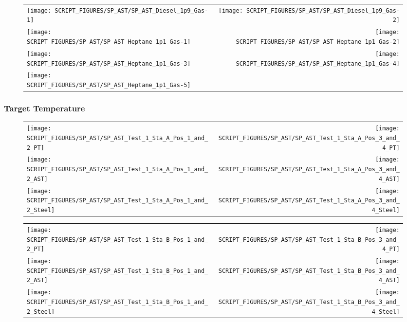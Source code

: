 \begin{figure}[!ht]
\begin{tabular*}{\textwidth}{l@{\extracolsep{\fill}}r}
\texttt{[image: SCRIPT\_FIGURES/SP\_AST/SP\_AST\_Diesel\_1p9\_Gas-1]}   &  \texttt{[image: SCRIPT\_FIGURES/SP\_AST/SP\_AST\_Diesel\_1p9\_Gas-2]}    \\
\texttt{[image: SCRIPT\_FIGURES/SP\_AST/SP\_AST\_Heptane\_1p1\_Gas-1]}  &  \texttt{[image: SCRIPT\_FIGURES/SP\_AST/SP\_AST\_Heptane\_1p1\_Gas-2]}    \\
\texttt{[image: SCRIPT\_FIGURES/SP\_AST/SP\_AST\_Heptane\_1p1\_Gas-3]}  &  \texttt{[image: SCRIPT\_FIGURES/SP\_AST/SP\_AST\_Heptane\_1p1\_Gas-4]}     \\
\texttt{[image: SCRIPT\_FIGURES/SP\_AST/SP\_AST\_Heptane\_1p1\_Gas-5]}  &
\end{tabular*}
\label{SP_Diesel_1p9_Gas}
\end{figure}

\clearpage

\subsubsection{Target Temperature}

\begin{figure}[!ht]
\begin{tabular*}{\textwidth}{l@{\extracolsep{\fill}}r}
\texttt{[image: SCRIPT\_FIGURES/SP\_AST/SP\_AST\_Test\_1\_Sta\_A\_Pos\_1\_and\_2\_PT]} &
\texttt{[image: SCRIPT\_FIGURES/SP\_AST/SP\_AST\_Test\_1\_Sta\_A\_Pos\_3\_and\_4\_PT]} \\
\texttt{[image: SCRIPT\_FIGURES/SP\_AST/SP\_AST\_Test\_1\_Sta\_A\_Pos\_1\_and\_2\_AST]} &
\texttt{[image: SCRIPT\_FIGURES/SP\_AST/SP\_AST\_Test\_1\_Sta\_A\_Pos\_3\_and\_4\_AST]} \\
\texttt{[image: SCRIPT\_FIGURES/SP\_AST/SP\_AST\_Test\_1\_Sta\_A\_Pos\_1\_and\_2\_Steel]} &
\texttt{[image: SCRIPT\_FIGURES/SP\_AST/SP\_AST\_Test\_1\_Sta\_A\_Pos\_3\_and\_4\_Steel]}
\end{tabular*}
\label{SP_Test_1_Station_A}
\end{figure}

\begin{figure}[!ht]
\begin{tabular*}{\textwidth}{l@{\extracolsep{\fill}}r}
\texttt{[image: SCRIPT\_FIGURES/SP\_AST/SP\_AST\_Test\_1\_Sta\_B\_Pos\_1\_and\_2\_PT]} &
\texttt{[image: SCRIPT\_FIGURES/SP\_AST/SP\_AST\_Test\_1\_Sta\_B\_Pos\_3\_and\_4\_PT]} \\
\texttt{[image: SCRIPT\_FIGURES/SP\_AST/SP\_AST\_Test\_1\_Sta\_B\_Pos\_1\_and\_2\_AST]} &
\texttt{[image: SCRIPT\_FIGURES/SP\_AST/SP\_AST\_Test\_1\_Sta\_B\_Pos\_3\_and\_4\_AST]} \\
\texttt{[image: SCRIPT\_FIGURES/SP\_AST/SP\_AST\_Test\_1\_Sta\_B\_Pos\_1\_and\_2\_Steel]} &
\texttt{[image: SCRIPT\_FIGURES/SP\_AST/SP\_AST\_Test\_1\_Sta\_B\_Pos\_3\_and\_4\_Steel]}
\end{tabular*}
\label{SP_Test_1_Station_B}
\end{figure}

